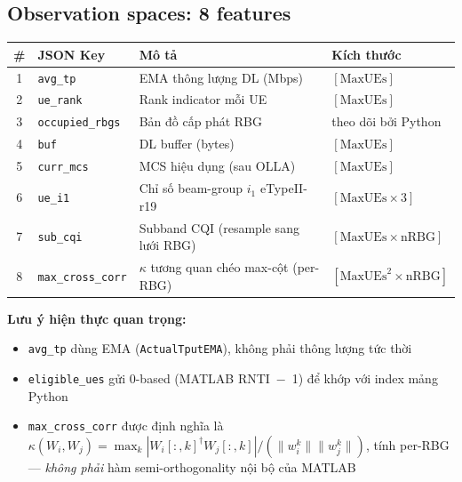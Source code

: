 \documentclass[12pt, a4paper]{article}
\begin{document}
\subsection{Observation spaces: 8 features}

\begin{center}
\begin{tabular}{cL{2.7cm}L{5.5cm}L{3.5cm}}
\toprule
\textbf{\#} & \textbf{JSON Key} & \textbf{Mô tả} & \textbf{Kích thước} \\
 & \texttt{avg\_tp}       & EMA thông lượng DL (Mbps)              & $[\text{MaxUEs}]$ \\[3pt]
2 & \texttt{ue\_rank}      & Rank indicator mỗi UE                  & $[\text{MaxUEs}]$ \\[3pt]
3 & \texttt{occupied\_rbgs}& Bản đồ cấp phát RBG                    & theo dõi bởi Python \\[3pt]
4 & \texttt{buf}           & DL buffer (bytes)                      & $[\text{MaxUEs}]$ \\[3pt]
5 & \texttt{curr\_mcs}     & MCS hiệu dụng (sau OLLA)               & $[\text{MaxUEs}]$ \\[3pt]
6 & \texttt{ue\_i1}        & Chỉ số beam-group $i_1$ eTypeII-r19    & $[\text{MaxUEs} \times 3]$ \\[3pt]
7 & \texttt{sub\_cqi}      & Subband CQI (resample sang lưới RBG)   & $[\text{MaxUEs} \times \text{nRBG}]$ \\[3pt]
8 & \texttt{max\_cross\_corr} & $\kappa$ tương quan chéo max-cột (per-RBG) &
  $[\text{MaxUEs}^2 \times \text{nRBG}]$ \\
\bottomrule
\end{tabular}
\label{tab:obs}
\end{center}

\noindent\textbf{Lưu ý hiện thực quan trọng:}
\begin{itemize}[nosep]
  \item \texttt{avg\_tp} dùng EMA (\texttt{ActualTputEMA}), không phải
        thông lượng tức thời
  \item \texttt{eligible\_ues} gửi 0-based (MATLAB RNTI~$-$~1) để khớp
        với index mảng Python
  \item \texttt{max\_cross\_corr} được định nghĩa là
        $\kappa(W_i, W_j) = \max_k |W_i[:,k]^\dagger W_j[:,k]| / (\|w_i^k\|\|w_j^k\|)$,
        tính per-RBG --- \emph{không phải} hàm semi-orthogonality nội bộ của MATLAB
\end{itemize}
\end{document}
